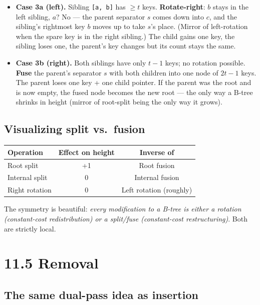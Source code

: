 \documentclass[11pt]{article}
\begin{document}
\begin{itemize}[leftmargin=*]
    \item \textbf{Case 3a (left).} Sibling \texttt{[a, b]} has
          $\ge t$ keys. \textbf{Rotate-right}: $b$ stays in the left
          sibling, $a$? No --- the parent separator $s$ comes down
          into $c$, and the sibling's rightmost key $b$ moves up to
          take $s$'s place. (Mirror of left-rotation when the spare
          key is in the right sibling.) The child gains one key,
          the sibling loses one, the parent's key changes but its
          count stays the same.
    \item \textbf{Case 3b (right).} Both siblings have only $t - 1$
          keys; no rotation possible. \textbf{Fuse} the parent's
          separator $s$ with both children into one node of
          $2t - 1$ keys. The parent loses one key + one child
          pointer. If the parent was the root and is now empty,
          the fused node becomes the new root --- the only way a
          B-tree shrinks in height (mirror of root-split being the
          only way it grows).
\end{itemize}

\subsection*{Visualizing split vs.\ fusion}

\begin{center}
\begin{tabular}{lcc}
\hline
Operation & Effect on height & Inverse of \\
\hline
Root split & +1 & Root fusion \\
Internal split & 0 & Internal fusion \\
Right rotation & 0 & Left rotation (roughly) \\
\hline
\end{tabular}
\end{center}

The symmetry is beautiful: \emph{every modification to a B-tree is either a rotation (constant-cost redistribution) or a split/fuse (constant-cost restructuring)}. Both are strictly local.

\section{11.5 Removal}

\subsection*{The same dual-pass idea as insertion}
\end{document}
